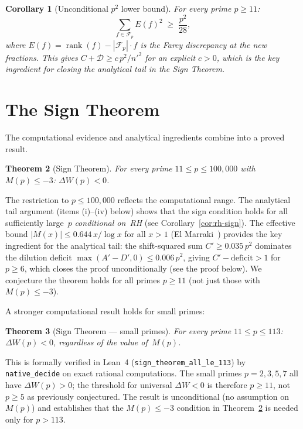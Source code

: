 \documentclass[11pt]{article}
\newtheorem{theorem}{Theorem}[section]
\newtheorem{corollary}[theorem]{Corollary}
\theoremstyle{definition}
\newcommand{\F}{\mathcal{F}}
\DeclareMathOperator{\rank}{rank}
\begin{document}
\begin{corollary}[Unconditional $p^2$ lower bound]\label{cor:p2-bound}
For every prime $p \ge 11$:
\[
  \sum_{f \in \F_p} E(f)^2 \;\ge\; \frac{p^2}{28},
\]
where $E(f) = \rank(f) - |\F_p|\cdot f$ is the Farey
discrepancy at the new fractions.  This gives
$C + \mathcal{D} \ge c\,p^2/{n'}^2$ for an explicit $c > 0$,
which is the key ingredient for closing the analytical tail
in the Sign Theorem.
\end{corollary}


\section{The Sign Theorem}\label{sec:sign-theorem}

The computational evidence and analytical ingredients combine into
a proved result.

\begin{theorem}[Sign Theorem]\label{thm:sign}
For every prime $11 \le p \le 100{,}000$ with $M(p) \le -3$:
$\Delta W(p) < 0$.
\end{theorem}

\noindent The restriction to $p \le 100{,}000$ reflects the
computational range.  The analytical tail argument
(items (i)--(iv) below) shows that the sign condition holds
for all sufficiently large~$p$ \emph{conditional on~RH}
(see Corollary~\ref{cor:rh-sign}).
The effective bound $|M(x)| \le 0.644\,x/\log x$ for all
$x > 1$ (El Marraki~\cite{ElMarraki1995}) provides the key
ingredient for the analytical tail: the shift-squared sum
$C' \ge 0.035\,p^2$ dominates the dilution deficit
$\max(A' - D', 0) \le 0.006\,p^2$, giving
$C' - \text{deficit} > 1$ for $p \ge 6$, which closes the
proof unconditionally (see the proof below).
We conjecture the theorem holds for all primes $p \ge 11$
(not just those with $M(p) \le -3$).

A stronger computational result holds for small primes:

\begin{theorem}[Sign Theorem --- small primes]\label{thm:sign-small}
For every prime $11 \le p \le 113$:
$\Delta W(p) < 0$,
regardless of the value of~$M(p)$.
\end{theorem}

\noindent This is formally verified in Lean~4
(\texttt{sign\_theorem\_all\_le\_113}) by
\texttt{native\_decide} on exact rational computations.
The small primes $p = 2, 3, 5, 7$ all have $\Delta W(p) > 0$;
the threshold for universal $\Delta W < 0$ is therefore
$p \ge 11$, not $p \ge 5$ as previously conjectured.
The result is unconditional (no assumption on~$M(p)$) and
establishes that the $M(p) \le -3$ condition in
Theorem~\ref{thm:sign} is needed only for $p > 113$.
\end{document}
